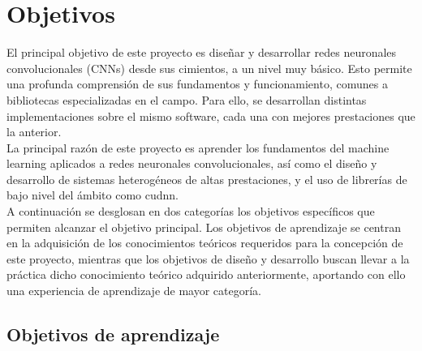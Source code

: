 \section{Objetivos}

El principal objetivo de este proyecto es diseñar y desarrollar redes neuronales convolucionales (CNNs) desde sus cimientos, a un nivel muy básico. Esto permite una profunda comprensión de sus fundamentos y funcionamiento, comunes a bibliotecas especializadas en el campo. Para ello, se desarrollan distintas implementaciones sobre el mismo software, cada una con mejores prestaciones que la anterior. \\
La principal razón de este proyecto es aprender los fundamentos del machine learning aplicados a redes neuronales convolucionales, así como el diseño y desarrollo de sistemas heterogéneos de altas prestaciones, y el uso de librerías de bajo nivel del ámbito como cudnn. \\
A continuación se desglosan en dos categorías los objetivos específicos que permiten alcanzar el objetivo principal. Los objetivos de aprendizaje se centran en la adquisición de los conocimientos teóricos requeridos para la concepción de este proyecto, mientras que los objetivos de diseño y desarrollo buscan llevar a la práctica dicho conocimiento teórico adquirido anteriormente, aportando con ello una experiencia de aprendizaje de mayor categoría.

\subsection{Objetivos de aprendizaje}


